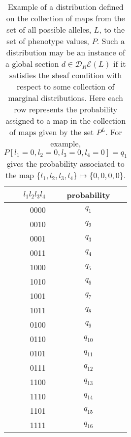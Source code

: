 \begin{table}[!ht]
\centering
\begin{tabular}{ r || c }
$l_1 l_2 l_3 l_4$ & probability \\ \hline
0000 & $q_1$ \\
0010 & $q_2$ \\
0001 & $q_3$ \\
0011 & $q_4$ \\
1000 & $q_5$ \\
1010 & $q_6$ \\
1001 & $q_7$ \\
1011 & $q_8$ \\
0100 & $q_9$ \\
0110 & $q_{10}$ \\
0101 & $q_{11}$ \\
0111 & $q_{12}$ \\
1100 & $q_{13}$ \\
1110 & $q_{14}$ \\
1101 & $q_{15}$ \\
1111 & $q_{16}$
\end{tabular}
\caption{Example of a distribution defined on the collection of maps from the set of all possible alleles, $L$, to the set of phenotype values, $P$. Such a distribution may be an instance of a global section $d \in \mathcal{D}_R\mathcal{E}(L)$ if it satisfies the sheaf condition with respect to some collection of marginal distributions. Here each row represents the probability assigned to a map in the collection of maps given by the set $P^L$. For example, $P[l_1=0,l_2=0,l_3=0,l_4=0]=q_1$ gives the probability associated to the map $\{l_1, l_2, l_3, l_4\} \mapsto \{0,0,0,0\}$.}
\label{tab:hidvarmod}
\end{table}

